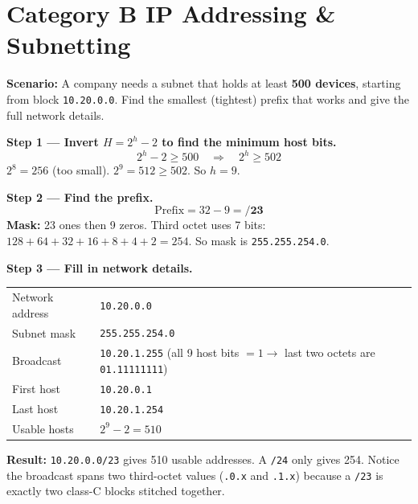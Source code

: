 \documentclass[11pt, letterpaper]{article}
\begin{document}
\newpage

\section*{Category B \quad IP Addressing \& Subnetting}

\begin{tcolorbox}[colback=partbg, colframe=sectionblue,
  title={\bfseries Problem B1 --- Inverse Host Count: What Prefix Do I Need?}, arc=3pt, boxrule=1pt]
\textbf{Scenario:} A company needs a subnet that holds at least \textbf{500 devices},
starting from block \texttt{10.20.0.0}. Find the smallest (tightest) prefix that works
and give the full network details.
\end{tcolorbox}

\textbf{Step 1 --- Invert $H = 2^h - 2$ to find the minimum host bits.}
\[2^h - 2 \geq 500 \quad\Longrightarrow\quad 2^h \geq 502\]
$2^8 = 256$ (too small). $2^9 = 512 \geq 502$. So $h = 9$.

\textbf{Step 2 --- Find the prefix.}
\[\text{Prefix} = 32 - 9 = \mathbf{/23}\]
\textbf{Mask:} 23 ones then 9 zeros. Third octet uses 7 bits: $128+64+32+16+8+4+2 = 254$.
So mask is \texttt{255.255.254.0}.

\textbf{Step 3 --- Fill in network details.}

\begin{center}
\renewcommand{\arraystretch}{1.2}
\begin{tabular}{ll}
\toprule
Network address & \texttt{10.20.0.0} \\
Subnet mask     & \texttt{255.255.254.0} \\
Broadcast       & \texttt{10.20.1.255} \quad (all 9 host bits $= 1 \to$ last two octets are \texttt{01.11111111}) \\
First host      & \texttt{10.20.0.1} \\
Last host       & \texttt{10.20.1.254} \\
Usable hosts    & $2^9 - 2 = 510$ \\
\bottomrule
\end{tabular}
\end{center}

\begin{tcolorbox}[colback=partbg, colframe=sectionblue, arc=3pt, boxrule=1pt]
\textbf{Result:} \texttt{10.20.0.0/23} gives 510 usable addresses. A \texttt{/24} only
gives 254. Notice the broadcast spans two third-octet values (\texttt{.0.x} and \texttt{.1.x})
because a \texttt{/23} is exactly two class-C blocks stitched together.
\end{tcolorbox}
\end{document}
